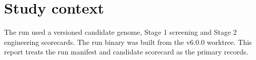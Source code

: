 \section{Study context}The run used a versioned candidate genome, Stage 1 screening and Stage 2 engineering scorecards. The run binary was built from the v6.0.0 worktree. This report treats the run manifest and candidate scorecard as the primary records.
